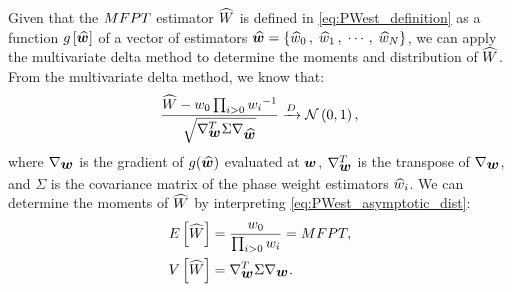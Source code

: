 Given that the $MFPT$ estimator $\widehat{W}$ is defined in \eqref{eq:PWest_definition} as a function $g\left[ \mbox{\boldmath $ \widehat{w}_{} $} \right]$ of a vector of \ncon estimators $\mbox{\boldmath $ \widehat{w}_{} $} = \left\{ \widehat{w}_{0} \,, \; \widehat{w}_{1} \,, \; \cdots \,, \; \widehat{w}_{N} \right\}$, we can apply the multivariate delta method\supercite{Wasserman:2013dt} to determine the moments and distribution of $\widehat{W}$. From the multivariate delta method, we know that:
    \begin{equation}
    \label{eq:PWest_asymptotic_dist}
        \frac{\widehat{W} - w_{0} \prod_{i>0} w_{i} {}^{-1}}{\sqrt{\nabla_{\mbox{\boldmath $ w_{} $}}^{T} \Sigma \nabla_{\mbox{\boldmath $ \widehat{w}_{} $}}}} \xrightarrow{D} \mathcal{N}\left( 0 , 1 \right),
    \end{equation}
where $\nabla_{\mbox{\boldmath $ w_{} $}}$ is the gradient of $g(\mbox{\boldmath $ \widehat{w}_{} $})$ evaluated at $\mbox{\boldmath $ w_{} $}$, $\nabla_{\mbox{\boldmath $ w_{} $}}^{T}$ is the transpose of $\nabla_{\mbox{\boldmath $ w_{} $}}$, and $\Sigma$ is the covariance matrix of the phase weight estimators $\widehat{w}_{i}$. We can determine the moments of $\widehat{W}$ by interpreting \eqref{eq:PWest_asymptotic_dist}:
    \begin{align}
    \label{eq:PWest_moments}
        \begin{split}
            E \left[ \widehat{W} \right] &=\frac{w_{0}}{\prod_{i>0} w_{i}} = MFPT, \\
            V \left[ \widehat{W} \right] &= \nabla_{\mbox{\boldmath $ w_{} $}}^{T} \Sigma \nabla_{\mbox{\boldmath $ w_{} $}}.
        \end{split}
    \end{align}

